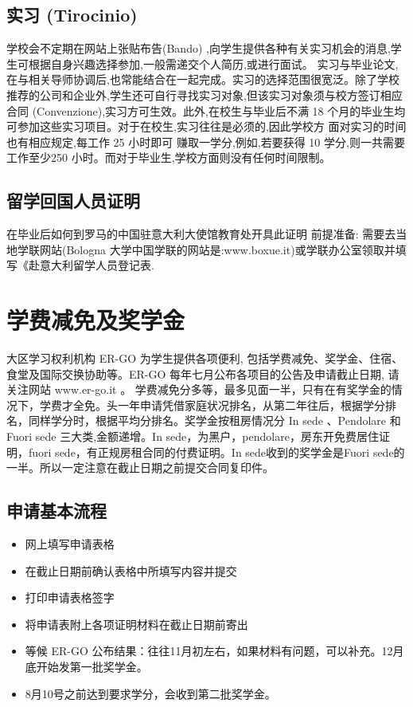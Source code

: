 \subsection{实习 (Tirocinio)}
学校会不定期在网站上张贴布告(Bando) ,向学生提供各种有关实习机会的消息,学生可根据自身兴趣选择参加,一般需递交个人简历,或进行面试。 实习与毕业论文,在与相关导师协调后,也常能结合在一起完成。实习的选择范围很宽泛。除了学校推荐的公司和企业外,学生还可自行寻找实习对象,但该实习对象须与校方签订相应合同 (Convenzione),实习方可生效。此外,在校生与毕业后不满 18 个月的毕业生均可参加这些实习项目。对于在校生,实习往往是必须的,因此学校方 面对实习的时间也有相应规定,每工作 25 小时即可 
赚取一学分,例如,若要获得 10 学分,则一共需要工作至少250 小时。而对于毕业生,学校方面则没有任何时间限制。 
\subsection{留学回国人员证明}
在毕业后如何到罗马的中国驻意大利大使馆教育处开具此证明 
前提准备: 需要去当地学联网站(Bologna 大学中国学联的网站是:www.boxue.it)或学联办公室领取并填写《赴意大利留学人员登记表.

\section{学费减免及奖学金}

大区学习权利机构 ER-GO 为学生提供各项便利, 包括学费减免、奖学金、住宿、食堂及国际交换协助等。ER-GO 每年七月公布各项目的公告及申请截止日期, 请关注网站 www.er-go.it 。 
学费减免分多等，最多见面一半，只有在有奖学金的情况下，学费才全免。头一年申请凭借家庭状况排名，从第二年往后，根据学分排名，同样学分时，根据平均分排名。奖学金按租房情况分 In sede 、Pendolare 和 Fuori sede 三大类,金额递增。In sede，为黑户，pendolare，房东开免费居住证明，fuori sede，有正规房租合同的付费证明。In sede收到的奖学金是Fuori sede的一半。所以一定注意在截止日期之前提交合同复印件。

\subsection{申请基本流程}
\begin{itemize}
 \item 网上填写申请表格 
 \item 在截止日期前确认表格中所填写内容并提交 
 \item 打印申请表格签字 
 \item 将申请表附上各项证明材料在截止日期前寄出 
 \item 等候 ER-GO 公布结果：往往11月初左右，如果材料有问题，可以补充。12月底开始发第一批奖学金。
 \item 8月10号之前达到要求学分，会收到第二批奖学金。
\end{itemize}

